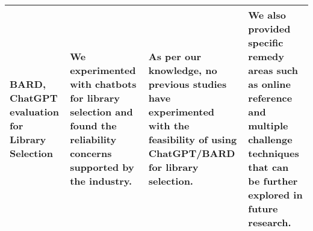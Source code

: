 \begin{table}[]
\begin{tabular}{>{\raggedright}p{1.6cm}p{3.2cm}p{4.7cm}p{4cm}}
            BARD, ChatGPT evaluation for Library Selection & We experimented with chatbots for library selection and found the reliability concerns supported by the industry. & As per our knowledge, no previous studies have experimented with the feasibility of using ChatGPT/BARD for library selection. & 
            We also provided specific remedy areas such as online reference and multiple challenge techniques that can be further explored in future research. \\
            
        \bottomrule
    \end{tabular}
    \label{tab:contribution-summary}
\end{table}
